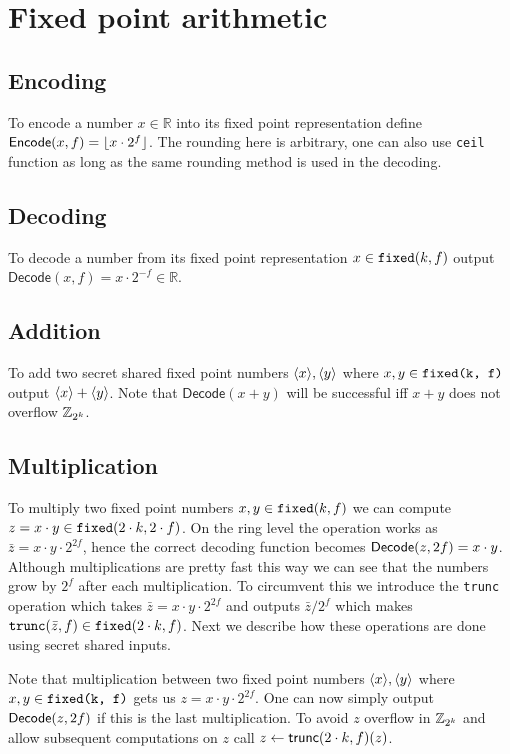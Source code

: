 \section{Fixed point arithmetic}
\label{app:fixed-point}

\subsection{Encoding} To encode a number $x \in \mathbb{R}$ into its fixed
point representation define $\mathsf{Encode}(x, f) = \lfloor x \cdot 2^f\rfloor$.
The rounding here is arbitrary, one can also use \verb|ceil| function as long
as the same rounding method is used in the decoding.

\subsection{Decoding} To decode a number from its fixed point representation
$x \in \verb|fixed|(k, f)$ output $\mathsf{Decode}(x, f) = x \cdot 2^{-f} \in \mathbb{R}$.

\subsection{Addition} To add two secret shared fixed point numbers
$\langle {x} \rangle, \langle {y} \rangle$ where $x,y \in \verb|fixed(k, f)|$ output
$\langle {x} \rangle+\langle {y} \rangle$. Note that $\mathsf{Decode}(x+y)$ will be successful
iff $x+y$ does not overflow $\mathbb{Z}_{2^k}$.

\subsection{Multiplication}

To multiply two fixed point numbers $x, y \in \verb|fixed|(k, f)$ we can
compute $z = x \cdot y \in \verb|fixed|(2 \cdot k, 2\cdot f)$. On the ring
level the operation works as $\bar{z} = x \cdot y \cdot 2 ^ {2f}$, hence the
correct decoding function becomes $\mathsf{Decode}(z, 2f) = x \cdot y$. Although
multiplications are pretty fast this way we can see that the numbers grow by
$2^f$ after each multiplication. To circumvent this we introduce the
\verb|trunc| operation which takes $\bar{z} = x \cdot y \cdot 2^{2f}$ and outputs $\bar{z} / 2^{f}$
which makes $\verb|trunc|(\bar{z}, f) \in \verb|fixed|(2 \cdot k, f)$.
Next we describe how these operations are done using secret shared inputs.

 Note that
multiplication between two fixed point numbers $\langle {x} \rangle, \langle {y} \rangle$ where
$x,y \in \verb|fixed(k, f)|$ gets us $z = x \cdot y \cdot 2^{2f}$. One can
now simply output $\mathsf{Decode}(z, 2f)$ if this is the last multiplication.
To avoid $z$ overflow in $\mathbb{Z}_{2^k}$ and allow
subsequent computations on $z$ call $z \gets \mathsf{trunc}(2 \cdot k, f)(z)$.

